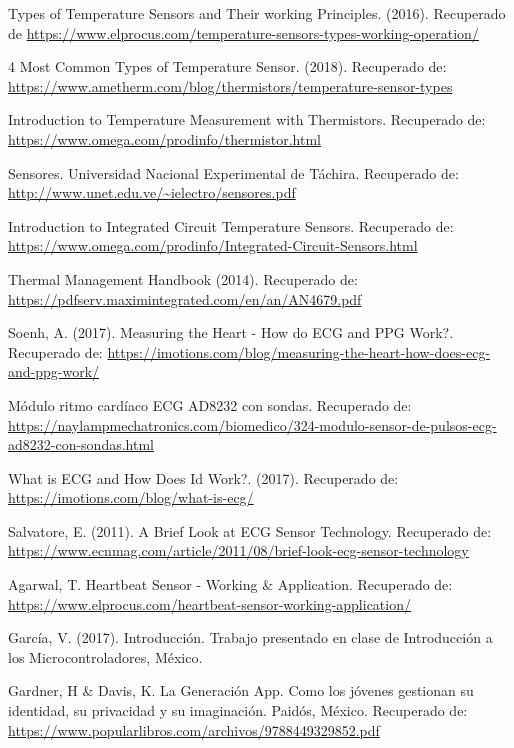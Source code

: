 \begin{thebibliography}{0}
	 Types of Temperature Sensors and Their working Principles. (2016). Recuperado de \url{https://www.elprocus.com/temperature-sensors-types-working-operation/}
	
	 4 Most Common Types of Temperature Sensor. (2018). Recuperado de: \url{https://www.ametherm.com/blog/thermistors/temperature-sensor-types}
	
	 Introduction to Temperature Measurement with Thermistors. Recuperado de: \url{https://www.omega.com/prodinfo/thermistor.html}
	
	 Sensores. Universidad Nacional Experimental de Táchira. Recuperado de: \url{http://www.unet.edu.ve/~ielectro/sensores.pdf}
	
	 Introduction to Integrated Circuit Temperature Sensors. Recuperado de: \url{https://www.omega.com/prodinfo/Integrated-Circuit-Sensors.html}
	
	 Thermal Management Handbook (2014). Recuperado de: \url{https://pdfserv.maximintegrated.com/en/an/AN4679.pdf}
	
	 Soenh, A. (2017). Measuring the Heart - How do ECG and PPG Work?. Recuperado de: \url{https://imotions.com/blog/measuring-the-heart-how-does-ecg-and-ppg-work/}
	
	 Módulo ritmo cardíaco ECG AD8232 con sondas. Recuperado de: \url{https://naylampmechatronics.com/biomedico/324-modulo-sensor-de-pulsos-ecg-ad8232-con-sondas.html}
	
	 What is ECG and How Does Id Work?. (2017). Recuperado de: \url{https://imotions.com/blog/what-is-ecg/}
	
	 Salvatore, E. (2011). A Brief Look at ECG Sensor Technology. Recuperado de: \url{https://www.ecnmag.com/article/2011/08/brief-look-ecg-sensor-technology}
	
	 Agarwal, T. Heartbeat Sensor - Working \& Application. Recuperado de: \url{https://www.elprocus.com/heartbeat-sensor-working-application/}
	
	 García, V. (2017). Introducción. Trabajo presentado en clase de Introducción a los Microcontroladores, México.
	
	 Gardner, H \& Davis, K. La Generación App. Como los jóvenes gestionan su identidad, su privacidad y su imaginación. Paidós, México. Recuperado de: \url{https://www.popularlibros.com/archivos/9788449329852.pdf}
	

\end{thebibliography}

